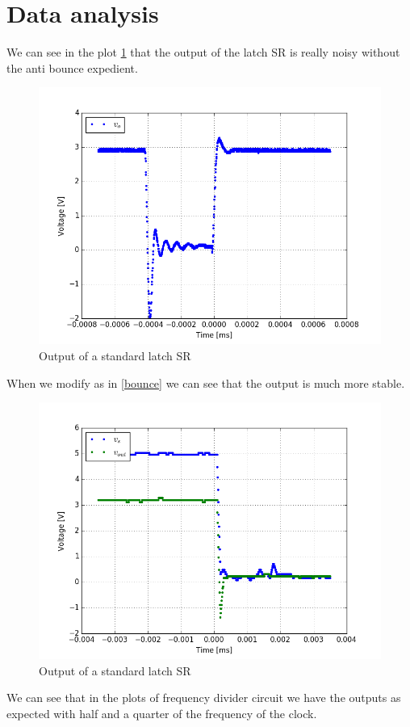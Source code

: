\section{Data analysis}
We can see in the plot \ref{bounce_time} that the output of the latch SR is really noisy without the anti bounce expedient.
\begin{figure}[H]
\centering
\includegraphics[width=.7\textwidth]{11/bounce_time.png}
\caption{Output of a standard latch SR}\label{bounce_time}
\end{figure}
When we modify as in \ref{bounce} we can see that the output is much more stable.
\begin{figure}[H]
\centering
\includegraphics[width=.7\textwidth]{11/anti_bounce_time3.png}
\caption{Output of a standard latch SR}\label{anti_bounce_time3}
\end{figure}
We can see that in the plots of frequency divider circuit we have the outputs as expected with half and a quarter of the frequency of the clock.

